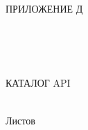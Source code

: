 \begin{ESKDtitlePage}
  \begin{flushright}
    ПРИЛОЖЕНИЕ Д \enspace
  \end{flushright}
  
  \begin{center}
    \envDiplomEducation \\
    \envDiplomUniversity \\
    \envDiplomCathedra \\
  \end{center}

  \vfill

  \begin{center}
    КАТАЛОГ API
  \end{center}

  \vfill

  \begin{center}
    \envCode \\
    Листов \pageref{LastPage} \\
  \end{center}

  \vfill

  

  \vfill

  \begin{center}
    \ESKDtheYear
  \end{center}
\end{ESKDtitlePage}
